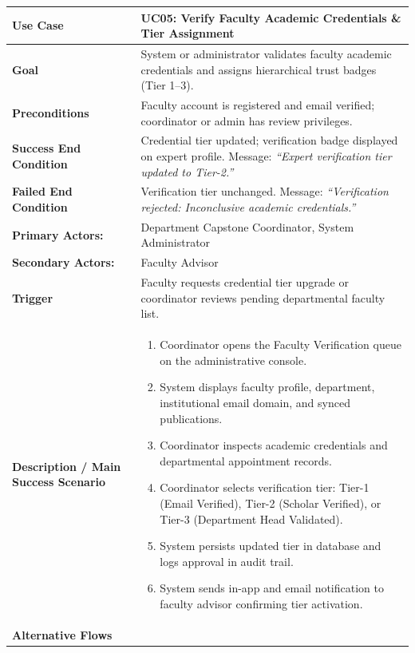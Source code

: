 \begin{table}[H]
\centering
\small
\begin{tabularx}{\textwidth}{|l|X|}
\hline
\rowcolor{lightgray!40} \textbf{Use Case} & \textbf{UC05: Verify Faculty Academic Credentials \& Tier Assignment} \\ \hline
\textbf{Goal} & System or administrator validates faculty academic credentials and assigns hierarchical trust badges (Tier 1--3). \\ \hline
\textbf{Preconditions} & Faculty account is registered and email verified; coordinator or admin has review privileges. \\ \hline
\textbf{Success End Condition} & Credential tier updated; verification badge displayed on expert profile. Message: \textit{``Expert verification tier updated to Tier-2.''} \\ \hline
\textbf{Failed End Condition} & Verification tier unchanged. Message: \textit{``Verification rejected: Inconclusive academic credentials.''} \\ \hline
\textbf{Primary Actors:} & Department Capstone Coordinator, System Administrator \\
\textbf{Secondary Actors:} & Faculty Advisor \\ \hline
\textbf{Trigger} & Faculty requests credential tier upgrade or coordinator reviews pending departmental faculty list. \\ \hline
\textbf{Description / Main Success Scenario} &
\begin{enumerate}[leftmargin=*]
    \item Coordinator opens the Faculty Verification queue on the administrative console.
    \item System displays faculty profile, department, institutional email domain, and synced publications.
    \item Coordinator inspects academic credentials and departmental appointment records.
    \item Coordinator selects verification tier: Tier-1 (Email Verified), Tier-2 (Scholar Verified), or Tier-3 (Department Head Validated).
    \item System persists updated tier in database and logs approval in audit trail.
    \item System sends in-app and email notification to faculty advisor confirming tier activation.
\end{enumerate} \\ \hline
\textbf{Alternative Flows} &
\begin{itemize}[leftmargin=*]

\end{itemize}
\end{tabularx}
\end{table}
